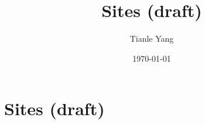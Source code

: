 \documentclass{noteformyself}
\title{Sites (draft)}
\author{Tianle Yang}
\date{\today}
\begin{document}
    \maketitle

    \section{Sites (draft)}



\end{document}
